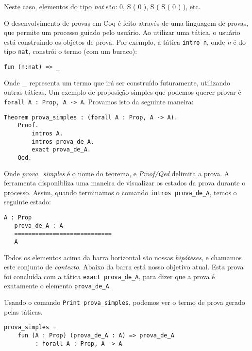 Neste caso, elementos do tipo \emph{nat} são: 0, S ( 0 ), S ( S ( 0 ) ), etc.

O desenvolvimento de provas em Coq é feito através de uma linguagem de provas,
que permite um processo guiado pelo usuário. Ao utilizar uma tática, o usuário
está construindo os objetos de prova. Por exemplo, a tática
\texttt{intro n}, onde \emph{n} é do tipo \texttt{nat}, constrói o termo (com um
buraco):

\begin{lstlisting}[basicstyle=\small]
    fun (n:nat) => _
\end{lstlisting}

Onde \_ representa um termo que irá ser construído futuramente, utilizando
outras táticas. Um exemplo de proposição simples que podemos querer provar é
\texttt{forall A : Prop, A -> A}. Provamos isto da seguinte maneira:

\begin{lstlisting}[basicstyle=\small]
    Theorem prova_simples : (forall A : Prop, A -> A).
    Proof.
        intros A.
        intros prova_de_A.
        exact prova_de_A.
    Qed.
\end{lstlisting}

Onde \emph{prova\_simples} é o nome do teorema, e \emph{Proof/Qed} delimita a
prova. A ferramenta disponibliza uma maneira de visualizar os estados da prova
durante o processo. Assim, quando terminamos o comando \texttt{intros
prova\_de\_A}, temos o seguinte estado:

\begin{lstlisting}[basicstyle=\small]
   A : Prop
   prova_de_A : A
   ============================
   A
\end{lstlisting}

Todos os elementos acima da barra horizontal são nossas \emph{hipóteses}, e
chamamos este conjunto de \emph{contexto}. Abaixo da barra está nosso objetivo
atual. Esta prova foi concluída com a tática \texttt{exact prova\_de\_A}, para
dizer que a prova é exatamente o elemento \texttt{prova\_de\_A}. 

Usando o comando \texttt{Print prova\_simples}, podemos ver o termo de prova
gerado pelas táticas.

\begin{lstlisting}[basicstyle=\small]
prova_simples = 
    fun (A : Prop) (prova_de_A : A) => prova_de_A
         : forall A : Prop, A -> A

\end{lstlisting}

